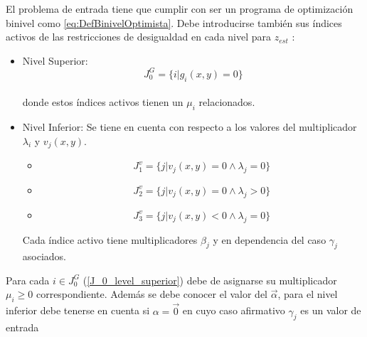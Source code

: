 %
El problema de entrada tiene que cumplir con ser un programa de optimización binivel como \ref{eq:DefBinivelOptimista}. 
Debe introducirse también sus índices activos de las restricciones de desigualdad en cada nivel para $z_{est}$ :
\begin{itemize}
    \item Nivel Superior:
            \begin{equation}
             J_0^G=\{i | g_i(x,y)=0\}
            \label{J_0_level_superior} %
            \end{equation}\\
    donde estos índices activos tienen un $\mu_i$ relacionados.
        
    \item Nivel Inferior:
                Se tiene en cuenta con respecto a los valores del multiplicador $\lambda_i$ y $v_j(x,y)$.
                
                \begin{itemize}
                    \item \begin{equation}
                        J_1^v=\{j | v_j(x,y)=0 \land \lambda_j=0 \} %
                        \end{equation} 
                    \item \begin{equation}
                        J_2^v=\{j | v_j(x,y)=0 \land \lambda_j>0 \}
                        \label{J_0_lambda_pos_level_inferior}
                    \end{equation}
                    \item \begin{equation}
                        J_3^v=\{j | v_j(x,y)< 0 \land \lambda_j=0 \}
                        \label{J_neg_lambda_0_level_inferior}
                    \end{equation}
                \end{itemize}
    Cada índice activo tiene multiplicadores $\beta_j$ y en dependencia del caso $\gamma_j$ asociados.
\end{itemize}
%

Para cada $i \in J_0^G$ (\ref{J_0_level_superior}) debe de asignarse su multiplicador $\mu_i \geq 0$ correspondiente.
Además se debe conocer el valor del $\vec{\alpha}$,
para el nivel inferior debe tenerse en cuenta si $\alpha=\vec{0}$ en cuyo caso afirmativo $\gamma_j$ es un valor de entrada

